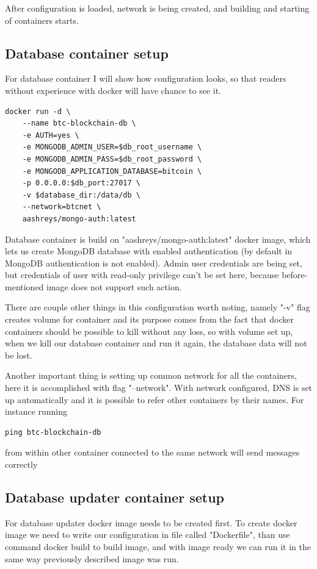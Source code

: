 \documentclass[12pt, en, eng, oneside]{mgr}
\begin{document}
After configuration is loaded, network is being created, and building and starting of containers starts.

\subsection{Database container setup}
For database container I will show how configuration looks, so that readers without experience with docker will have chance to see it.

\begin{verbatim}
docker run -d \
    --name btc-blockchain-db \
    -e AUTH=yes \
    -e MONGODB_ADMIN_USER=$db_root_username \
    -e MONGODB_ADMIN_PASS=$db_root_password \
    -e MONGODB_APPLICATION_DATABASE=bitcoin \
    -p 0.0.0.0:$db_port:27017 \
    -v $database_dir:/data/db \
    --network=btcnet \
    aashreys/mongo-auth:latest
\end{verbatim}

Database container is build on "aashreys/mongo-auth:latest" docker image, which lets us create MongoDB database with enabled authentication (by default in MongoDB authentication is not enabled).
Admin user credentials are being set, but credentials of user with read-only privilege can't be set here, because before-mentioned image does not support such action.

There are couple other things in this configuration worth noting, namely "-v" flag creates volume for container and its purpose comes from the fact that docker containers should be possible to kill without any loss, so with volume set up, when we kill our database container and run it again, the database data will not be lost.

Another important thing is setting up common network for all the containers, here it is accomplished with flag "--network". With network configured, DNS is set up automatically and it is possible to refer other containers by their names. For instance running 
\begin{verbatim}
ping btc-blockchain-db
\end{verbatim}  
from within other container connected to the same network will send messages correctly

\subsection{Database updater container setup}
For database updater docker image needs to be created first. To create docker image we need to write our configuration in file called "Dockerfile", than use command docker build to build image, and with image ready we can run it in the same way previously described image was run.
\end{document}
